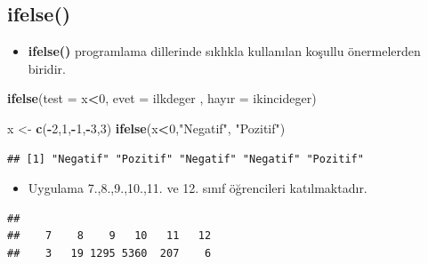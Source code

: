 \documentclass[
  oneside]{book}
\newenvironment{Shaded}{\begin{snugshade}}{\end{snugshade}}
\newcommand{\AttributeTok}[1]{\textcolor[rgb]{0.13,0.29,0.53}{#1}}
\newcommand{\DecValTok}[1]{\textcolor[rgb]{0.00,0.00,0.81}{#1}}
\newcommand{\FunctionTok}[1]{\textcolor[rgb]{0.13,0.29,0.53}{\textbf{#1}}}
\newcommand{\NormalTok}[1]{#1}
\newcommand{\OtherTok}[1]{\textcolor[rgb]{0.56,0.35,0.01}{#1}}
\newcommand{\SpecialCharTok}[1]{\textcolor[rgb]{0.81,0.36,0.00}{\textbf{#1}}}
\newcommand{\StringTok}[1]{\textcolor[rgb]{0.31,0.60,0.02}{#1}}
\providecommand{\tightlist}{%
  \setlength{\itemsep}{0pt}\setlength{\parskip}{0pt}}
\begin{document}
\hypertarget{ifelse}{%
\subsection{ifelse()}\label{ifelse}}

\begin{itemize}
\tightlist
\item
  \textbf{ifelse()} programlama dillerinde sıklıkla kullanılan koşullu önermelerden biridir.
\end{itemize}

\begin{Shaded}
\begin{Highlighting}[]
\FunctionTok{ifelse}\NormalTok{(}\AttributeTok{test =}\NormalTok{ x}\SpecialCharTok{\textless{}}\DecValTok{0}\NormalTok{, }\AttributeTok{evet =}\NormalTok{ ilkdeger , hayır }\OtherTok{=}\NormalTok{ ikincideger)}
\end{Highlighting}
\end{Shaded}

\begin{Shaded}
\begin{Highlighting}[]
\NormalTok{x }\OtherTok{\textless{}{-}} \FunctionTok{c}\NormalTok{(}\SpecialCharTok{{-}}\DecValTok{2}\NormalTok{,}\DecValTok{1}\NormalTok{,}\SpecialCharTok{{-}}\DecValTok{1}\NormalTok{,}\SpecialCharTok{{-}}\DecValTok{3}\NormalTok{,}\DecValTok{3}\NormalTok{)}
\FunctionTok{ifelse}\NormalTok{(x}\SpecialCharTok{\textless{}}\DecValTok{0}\NormalTok{,}\StringTok{"Negatif"}\NormalTok{, }\StringTok{"Pozitif"}\NormalTok{)}
\end{Highlighting}
\end{Shaded}

\begin{verbatim}
## [1] "Negatif" "Pozitif" "Negatif" "Negatif" "Pozitif"
\end{verbatim}

\begin{itemize}
\tightlist
\item
  Uygulama 7.,8.,9.,10.,11. ve 12. sınıf öğrencileri katılmaktadır.
\end{itemize}

\begin{Shaded}
\end{Shaded}

\begin{verbatim}
## 
##    7    8    9   10   11   12 
##    3   19 1295 5360  207    6
\end{verbatim}
\end{document}
